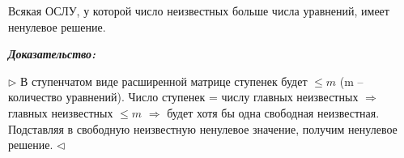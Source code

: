 \begin{corollary}
Всякая ОСЛУ, у которой число неизвестных больше числа уравнений, имеет ненулевое решение.
\end{corollary}

\textbf{\textit{Доказательство:}} 

$\rhd$ В ступенчатом виде расширенной матрице ступенек будет $\le m$ (m -- количество уравнений). Число ступенек = числу главных неизвестных $\Rightarrow$ главных неизвестных $\le m$ $\Rightarrow$ будет хотя бы одна свободная неизвестная. Подставляя в свободную неизвестную ненулевое значение, получим ненулевое решение. $\lhd$

